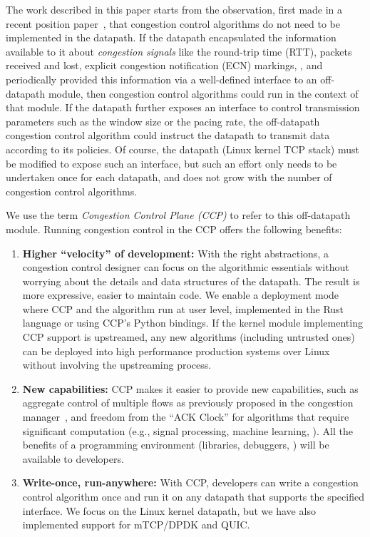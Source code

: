 The work described in this paper starts from the observation, first made in a
recent position paper~\cite{ccp-hotnets}, that congestion control algorithms do
not need to be implemented in the datapath. If the datapath encapsulated the
information available to it about {\em congestion signals} like the round-trip
time (RTT), packets received and lost, explicit congestion notification (ECN)
markings, \etc, and periodically provided this information via a well-defined
interface to an off-datapath module, then congestion control algorithms could
run in the context of that module.
%
If the datapath further exposes an interface to control transmission parameters
such as the window size or the pacing rate, the off-datapath congestion control
algorithm could instruct the datapath to transmit data according to its
policies.
%
Of course, the datapath (\eg Linux kernel TCP stack) must be modified to expose
such an interface, but such an effort only needs to be undertaken once for each
datapath, and does not grow with the number of congestion control algorithms.

We use the term {\em Congestion Control Plane (CCP)} to refer to this off-datapath module. Running congestion control in the CCP offers the following benefits:
\begin{enumerate}
    \item {\bf Higher ``velocity'' of development:} With the right abstractions,
      a congestion control designer can focus on the algorithmic essentials
      without worrying about the details and data structures of the
      datapath. The result is more expressive, easier to maintain code. We
      enable a deployment mode where CCP and the algorithm run at user level,
      implemented in the Rust language or using CCP's Python bindings. If the
      kernel module implementing CCP support is upstreamed, any new algorithms
      (including untrusted ones) can be deployed into high performance
      production systems over Linux without involving the upstreaming process.

    \item {\bf New capabilities:} CCP makes it easier to provide new
      capabilities, such as aggregate control of multiple flows as previously
      proposed in the congestion manager~\cite{cm}, and freedom from the ``ACK
      Clock'' for algorithms that require significant computation (e.g., signal
      processing, machine learning, \etc). All the benefits of a \userspace
      programming environment (libraries, debuggers, \etc) will be available to
      developers.

    \item {\bf Write-once, run-anywhere:} With CCP, developers can write a congestion control algorithm once and run it on any datapath that supports the specified interface. We focus on the Linux kernel datapath, but we have also implemented support for mTCP/DPDK and QUIC.
\end{enumerate}

